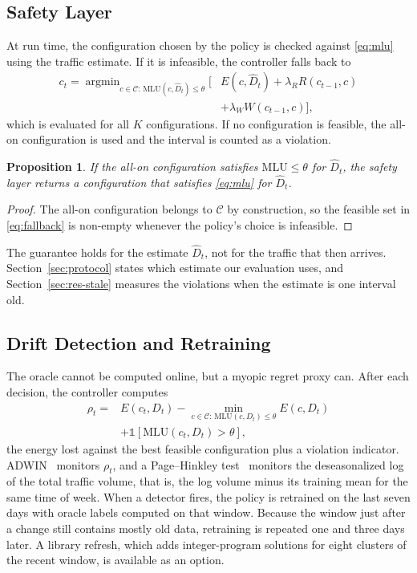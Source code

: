\documentclass[preprint,12pt]{elsarticle}
\newtheorem{proposition}{Proposition}
\begin{document}
\subsection{Safety Layer}

At run time, the configuration chosen by the policy is checked against \eqref{eq:mlu} using the traffic estimate. If it is infeasible, the controller falls back to
\begin{equation}\label{eq:fallback}
\begin{split}c_t=\mathop{\arg\min}_{c\in\mathcal{C}:\,\mathrm{MLU}(c,\hat D_t)\le\theta}\Big[&E(c,\hat D_t)+\lambda_R R(c_{t-1},c)\\
&+\lambda_W W(c_{t-1},c)\Big],\end{split}
\end{equation}
which is evaluated for all $K$ configurations. If no configuration is feasible, the all-on configuration is used and the interval is counted as a violation.
\begin{proposition}\label{prop:safety}
If the all-on configuration satisfies $\mathrm{MLU}\le\theta$ for $\hat D_t$, the safety layer returns a configuration that satisfies \eqref{eq:mlu} for $\hat D_t$.
\end{proposition}
\begin{proof}
The all-on configuration belongs to $\mathcal{C}$ by construction, so the feasible set in \eqref{eq:fallback} is non-empty whenever the policy's choice is infeasible.
\end{proof}
The guarantee holds for the estimate $\hat D_t$, not for the traffic that then arrives. Section~\ref{sec:protocol} states which estimate our evaluation uses, and Section~\ref{sec:res-stale} measures the violations when the estimate is one interval old.

\subsection{Drift Detection and Retraining}\label{sec:drift}

The oracle cannot be computed online, but a myopic regret proxy can. After each decision, the controller computes
\begin{equation}\label{eq:proxy}
\begin{split}\rho_t=&E(c_t,D_t)-\min_{c\in\mathcal{C}:\,\mathrm{MLU}(c,D_t)\le\theta}E(c,D_t)\\
&+\mathbb{1}[\mathrm{MLU}(c_t,D_t)>\theta],\end{split}
\end{equation}
the energy lost against the best feasible configuration plus a violation indicator. ADWIN~\cite{bifet2007adwin} monitors $\rho_t$, and a Page--Hinkley test~\cite{page1954cusum} monitors the deseasonalized log of the total traffic volume, that is, the log volume minus its training mean for the same time of week. When a detector fires, the policy is retrained on the last seven days with oracle labels computed on that window. Because the window just after a change still contains mostly old data, retraining is repeated one and three days later. A library refresh, which adds integer-program solutions for eight clusters of the recent window, is available as an option.
\end{document}
